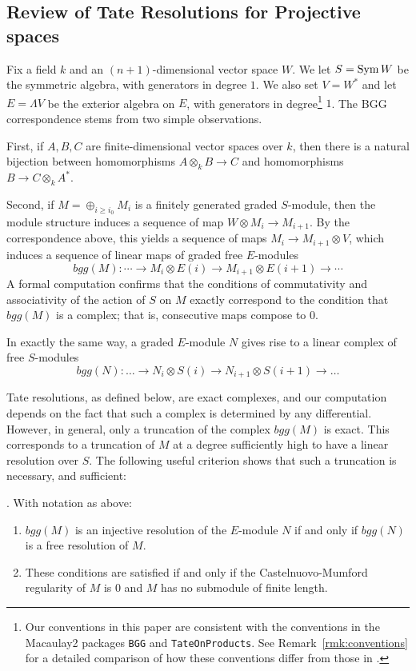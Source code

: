 \documentclass[twoside,12pt, leqno]{amsart}
\begin{document}
\subsection{Review of Tate Resolutions for Projective spaces}
Fix a field $k$ and an $(n+1)$-dimensional vector space $W$.  We let $S=\operatorname{Sym} W$ be the symmetric algebra, with generators in degree $1$.  We also set $V=W^*$ and let $E=\Lambda V$ be the exterior algebra on $E$, with generators in degree\footnote{Our conventions in this paper are consistent with the conventions in the Macaulay2 packages {\tt BGG} and {\tt TateOnProducts}.  See Remark~\ref{rmk:conventions} for a detailed comparison of how these conventions differ from those in \cite{EFS,EES}.}  $1$.   The BGG correspondence stems from two simple observations.


First, if $A, B, C$ are finite-dimensional vector spaces over $k$, then there is a natural bijection between  homomorphisms $A\otimes_kB\to C$ and homomorphisms
$ B \to C\otimes_k A^*$.

Second, if $M = \oplus_{i\geq i_0} M_i$ is a finitely generated graded $S$-module, then the module structure induces a sequence of map $W\otimes M_i \to M_{i+1}$.  By the correspondence above, this yields a sequence of maps $M_i\to M_{i+1}\otimes V$, which induces a sequence of
linear maps of graded free $E$-modules 
$$ 
bgg(M): \cdots \to M_i\otimes E(i) \to M_{i+1}\otimes E(i+1) \to \cdots
$$
A formal computation confirms that the conditions of commutativity and associativity of the action of $S$ on $M$ exactly correspond to the condition that $bgg(M)$ is a complex; that is, consecutive maps compose to 0.

In exactly the same way, a graded $E$-module $N$ gives rise to a linear  complex of free $S$-modules
$$bgg(N): \ldots \to N_i \otimes S(i) \to N_{i+1} \otimes  S(i+1) \to \ldots $$

Tate resolutions, as defined below, are exact complexes, and our computation depends on the fact that such a complex is
determined by any differential. However, in general, only a truncation of the complex $bgg(M)$ is exact. This corresponds to a truncation of $M$ at a degree sufficiently high to have a linear resolution over $S$. The following useful criterion shows that such a truncation is necessary, and sufficient:

\begin{theorem}[Reciprocity] \cite[Theorem 3.7 and Corollary 2.4] {EFS}\label{Reciprocity}. With notation as above:
\begin{enumerate}
 \item $bgg(M)$ is an injective resolution of the $E$-module $N$ if and only if
$bgg(N)$ is a free resolution of $M$.

\item These conditions are satisfied if and only if the Castelnuovo-Mumford regularity of $M$ is 0 and $M$ has no submodule of finite length.
\end{enumerate}
\end{theorem}
\end{document}
